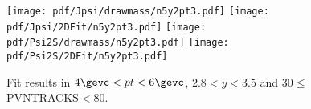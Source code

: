 \begin{figure}[H]
\begin{center}
\texttt{[image: pdf/Jpsi/drawmass/n5y2pt3.pdf]}
\texttt{[image: pdf/Jpsi/2DFit/n5y2pt3.pdf]}
\vspace*{-0.5cm}
\texttt{[image: pdf/Psi2S/drawmass/n5y2pt3.pdf]}
\texttt{[image: pdf/Psi2S/2DFit/n5y2pt3.pdf]}
\vspace*{-0.5cm}
\end{center}
\caption{Fit results in $4\gevc<pt<6\gevc$, $2.8<y<3.5$ and 30$\leq$PVNTRACKS$<$80.}
\label{Fitn5y2pt3}
\end{figure}
